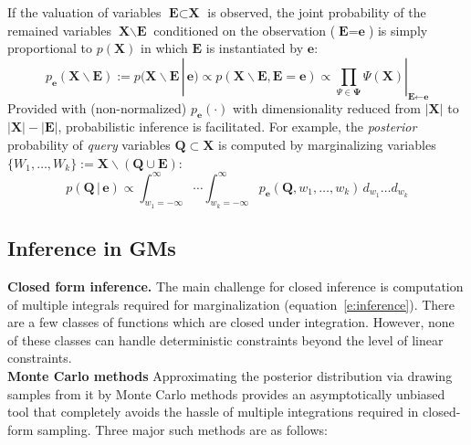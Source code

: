\documentclass[letterpaper]{article}
\renewcommand{\vec}[1]{\mathbf{#1}}
\newcommand{\bvec}[1]{\textbf{#1}}
\newcommand{\pr}{p}
\begin{document}
If the valuation of variables $\bvec{E} \subset \bvec{X}$ is observed,
the joint probability of the remained variables $\bvec{X} \backslash \bvec{E}$ conditioned on the observation ($\bvec{E} = \bvec{e}$) is simply proportional to $\pr(\bvec{X})$ in which $\bvec{E}$ is instantiated by $\bvec{e}$:
\begin{equation}
\label{e:posterior-joint}
\pr_{\bvec{e}}(\bvec{X} \backslash \bvec{E}) := 
\pr(\bvec{X} \backslash \bvec{E} \,|\, \bvec{e}) \propto 
\pr(\bvec{X} \backslash \bvec{E}, \bvec{E} = \bvec{e}) \propto
\prod_{\Psi \in \boldsymbol\Psi} \Psi (\vec{X})|_{\bvec{E} \leftarrow \bvec{e}}
\end{equation}
Provided with (non-normalized) $\pr_{\bvec{e}}(\cdot)$ with dimensionality reduced from $|\bvec{X}|$ to $|\bvec{X}| - |\bvec{E}|$, probabilistic inference is facilitated. 
For example, 
the \emph{posterior} probability of \emph{query} variables $\vec{Q} \subset \vec{X}$ 
is computed by marginalizing variables 
$\{W_1, \ldots, W_k\} := \vec{X} \backslash (\vec{Q} \cup \vec{E})$:
\begin{equation}
\label{e:inference}
\pr(\vec{Q} \,|\, \vec{e}) \propto 
\int_{w_1 = -\infty}^{\infty} \!\!\!\!\!\! \cdots \int_{w_k = -\infty}^{\infty}
\!\!\!\!\!\!\!\! \pr_{\bvec{e}}(\bvec{Q}, w_1, \ldots, w_k )
\, d_{w_1} \ldots d_{w_k}
\end{equation}
\subsection{Inference in GMs}
\textbf{Closed form inference.}
The main challenge for closed inference is computation of multiple integrals required for marginalization (equation~\ref{e:inference}).
There are a few classes of functions which are closed under integration.
However, none of these classes can handle deterministic constraints beyond the level of linear constraints.
\\
\textbf{Monte Carlo methods}
Approximating the posterior distribution via drawing samples from it by Monte Carlo methods 
provides an asymptotically unbiased tool that completely avoids the hassle of multiple integrations required in closed-form sampling.   
Three major such methods are as follows:
\end{document}
